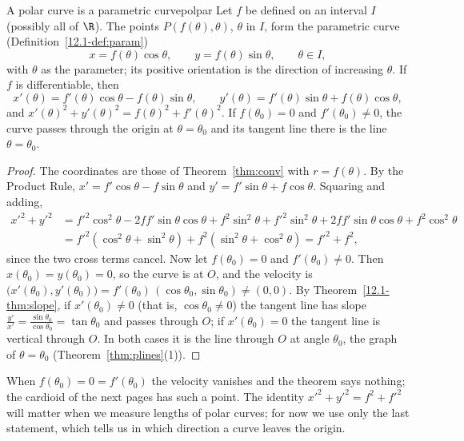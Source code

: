 \documentclass[11pt]{article}
\begin{document}
\begin{thm}{A polar curve is a parametric curve}{polpar}
Let $f$ be defined on an interval $I$ (possibly all of $\R$). The points $P(f(\theta),\theta)$, $\theta$ in $I$, form the parametric curve (Definition~\ref{12.1-def:param})
\[
x=f(\theta)\cos\theta,\qquad y=f(\theta)\sin\theta,\qquad\theta\in I,
\]
with $\theta$ as the parameter; its positive orientation is the direction of increasing $\theta$. If $f$ is differentiable, then
\[
x'(\theta)=f'(\theta)\cos\theta-f(\theta)\sin\theta,\qquad y'(\theta)=f'(\theta)\sin\theta+f(\theta)\cos\theta,
\]
and $x'(\theta)^2+y'(\theta)^2=f(\theta)^2+f'(\theta)^2$. If $f(\theta_0)=0$ and $f'(\theta_0)\ne0$, the curve passes through the origin at $\theta=\theta_0$ and its tangent line there is the line $\theta=\theta_0$.
\end{thm}
\begin{proof}
The coordinates are those of Theorem~\ref{thm:conv} with $r=f(\theta)$. By the Product Rule, $x'=f'\cos\theta-f\sin\theta$ and $y'=f'\sin\theta+f\cos\theta$. Squaring and adding,
\begin{align*}
x'^2+y'^2&=f'^2\cos^2\theta-2ff'\sin\theta\cos\theta+f^2\sin^2\theta+f'^2\sin^2\theta+2ff'\sin\theta\cos\theta+f^2\cos^2\theta\\
&=f'^2\left(\cos^2\theta+\sin^2\theta\right)+f^2\left(\sin^2\theta+\cos^2\theta\right)=f'^2+f^2,
\end{align*}
since the two cross terms cancel.
Now let $f(\theta_0)=0$ and $f'(\theta_0)\ne0$. Then $x(\theta_0)=y(\theta_0)=0$, so the curve is at $O$, and the velocity is $\bigl(x'(\theta_0),y'(\theta_0)\bigr)=f'(\theta_0)\,(\cos\theta_0,\sin\theta_0)\ne(0,0)$. By Theorem~\ref{12.1-thm:slope}, if $x'(\theta_0)\ne0$ (that is, $\cos\theta_0\ne0$) the tangent line has slope $\frac{y'}{x'}=\frac{\sin\theta_0}{\cos\theta_0}=\tan\theta_0$ and passes through $O$; if $x'(\theta_0)=0$ the tangent line is vertical through $O$. In both cases it is the line through $O$ at angle $\theta_0$, the graph of $\theta=\theta_0$ (Theorem~\ref{thm:plines}(1)).
\end{proof}

When $f(\theta_0)=0=f'(\theta_0)$ the velocity vanishes and the theorem says nothing; the cardioid of the next pages has such a point. The identity $x'^2+y'^2=f^2+f'^2$ will matter when we measure lengths of polar curves; for now we use only the last statement, which tells us in which direction a curve leaves the origin.
\end{document}

